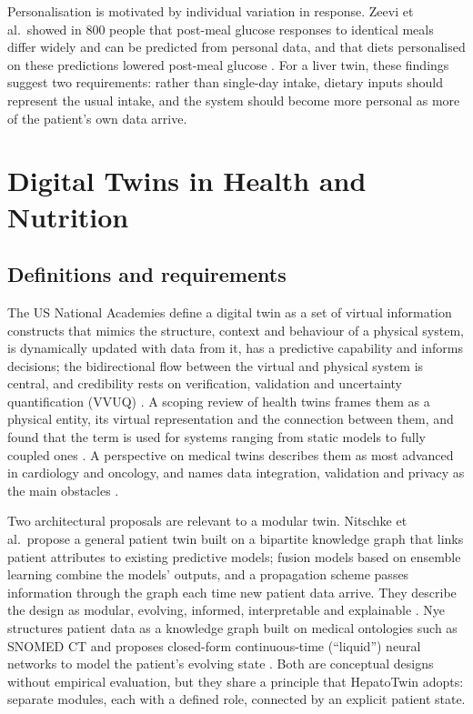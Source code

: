 Personalisation is motivated by individual variation in response. Zeevi et al.\ showed in 800 people that post-meal glucose responses to identical meals differ widely and can be predicted from personal data, and that diets personalised on these predictions lowered post-meal glucose \cite{zeevi2015personalized}. For a liver twin, these findings suggest two requirements: rather than single-day intake, dietary inputs should represent the usual intake, and the system should become more personal as more of the patient's own data arrive.

\section{Digital Twins in Health and Nutrition}
\label{sec:lr-dt}

\subsection{Definitions and requirements}

The US National Academies define a digital twin as a set of virtual information constructs that mimics the structure, context and behaviour of a physical system, is dynamically updated with data from it, has a predictive capability and informs decisions; the bidirectional flow between the virtual and physical system is central, and credibility rests on verification, validation and uncertainty quantification (VVUQ) \cite{nasem2024digitaltwins}. A scoping review of health twins frames them as a physical entity, its virtual representation and the connection between them, and found that the term is used for systems ranging from static models to fully coupled ones \cite{katsoulakis2024digital}. A perspective on medical twins describes them as most advanced in cardiology and oncology, and names data integration, validation and privacy as the main obstacles \cite{laubenbacher2024medicine}.

Two architectural proposals are relevant to a modular twin. Nitschke et al.\ propose a general patient twin built on a bipartite knowledge graph that links patient attributes to existing predictive models; fusion models based on ensemble learning combine the models' outputs, and a propagation scheme passes information through the graph each time new patient data arrive. They describe the design as modular, evolving, informed, interpretable and explainable \cite{nitschke2026design}. Nye structures patient data as a knowledge graph built on medical ontologies such as SNOMED CT and proposes closed-form continuous-time (``liquid'') neural networks to model the patient's evolving state \cite{nye2023knowledge}. Both are conceptual designs without empirical evaluation, but they share a principle that HepatoTwin adopts: separate modules, each with a defined role, connected by an explicit patient state.

